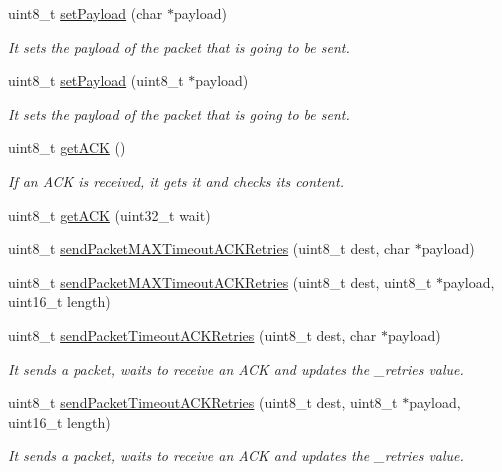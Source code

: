\begin{DoxyCompactItemize}
\item 
uint8\+\_\+t \hyperlink{class_wasp_s_x1272_a2985790c73d6e508c402dd3cfbdfece6}{set\+Payload} (char $\ast$payload)
\begin{DoxyCompactList}\small\item\em It sets the payload of the packet that is going to be sent. \end{DoxyCompactList}\item 
uint8\+\_\+t \hyperlink{class_wasp_s_x1272_abe88824e8f0e9bc8ce2f288753e4b51b}{set\+Payload} (uint8\+\_\+t $\ast$payload)
\begin{DoxyCompactList}\small\item\em It sets the payload of the packet that is going to be sent. \end{DoxyCompactList}\item 
uint8\+\_\+t \hyperlink{class_wasp_s_x1272_abd43427fcdcf3417fc4b6512dfb19a3f}{get\+A\+CK} ()
\begin{DoxyCompactList}\small\item\em If an A\+CK is received, it gets it and checks its content. \end{DoxyCompactList}\item 
uint8\+\_\+t \hyperlink{class_wasp_s_x1272_a84c2988f43ccd456b391dae02dc6c3e8}{get\+A\+CK} (uint32\+\_\+t wait)
\item 
uint8\+\_\+t \hyperlink{class_wasp_s_x1272_a1108494dcf0fab0071528d5a7734b656}{send\+Packet\+M\+A\+X\+Timeout\+A\+C\+K\+Retries} (uint8\+\_\+t dest, char $\ast$payload)
\item 
uint8\+\_\+t \hyperlink{class_wasp_s_x1272_a4f356ba87e5d4f4006de36bd2a128503}{send\+Packet\+M\+A\+X\+Timeout\+A\+C\+K\+Retries} (uint8\+\_\+t dest, uint8\+\_\+t $\ast$payload, uint16\+\_\+t length)
\item 
uint8\+\_\+t \hyperlink{class_wasp_s_x1272_a3bd0a1e6ea2deee167927e6a29b4d584}{send\+Packet\+Timeout\+A\+C\+K\+Retries} (uint8\+\_\+t dest, char $\ast$payload)
\begin{DoxyCompactList}\small\item\em It sends a packet, waits to receive an A\+CK and updates the \+\_\+retries value. \end{DoxyCompactList}\item 
uint8\+\_\+t \hyperlink{class_wasp_s_x1272_aac66b43d32e2564e20062603af3305fb}{send\+Packet\+Timeout\+A\+C\+K\+Retries} (uint8\+\_\+t dest, uint8\+\_\+t $\ast$payload, uint16\+\_\+t length)
\begin{DoxyCompactList}\small\item\em It sends a packet, waits to receive an A\+CK and updates the \+\_\+retries value. \end{DoxyCompactList}\item 

\end{DoxyCompactItemize}
